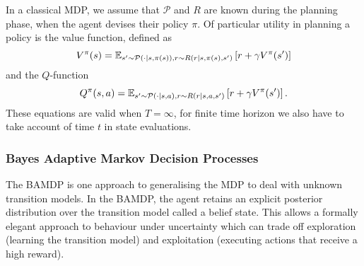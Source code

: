 \documentclass[a4paper, 10pt]{report}
\theoremstyle{plain}
\begin{document}
	In a classical MDP, we assume that $\mathcal{P}$ and $R$ are known during the planning phase, when the agent devises their policy $\pi$.
	Of particular utility in planning a policy is the value function, defined as
	\begin{equation}
	V^\pi(s) = \mathbb{E}_{s'\sim \mathcal{P}(\cdot|s,\pi(s)), r \sim R(r|s,\pi(s),s')}\left[ r + \gamma V^\pi(s') \right]
	\end{equation}
	and the $Q$-function
	\begin{equation}
	Q^\pi(s, a) = \mathbb{E}_{s'\sim \mathcal{P}(\cdot|s,a), r \sim R(r|s,a,s')}\left[ r + \gamma V^\pi(s') \right].
	\end{equation}
	These equations are valid when $T=\infty$, for finite time horizon we also have to take account of time $t$ in state evaluations.
	
	
	\subsubsection{Bayes Adaptive Markov Decision Processes}
	The BAMDP \citep{duff2002optimal,ross2007bayes,guez2012efficient,ghavamzadeh2016bayesian} is one approach to generalising the MDP to deal with unknown transition models. 
	In the BAMDP, the agent retains an explicit posterior distribution over the transition model called a belief state. 
	This allows a formally elegant approach to behaviour under uncertainty which can trade off exploration (learning the transition model) and exploitation (executing actions that receive a high reward). 
	
\end{document}
